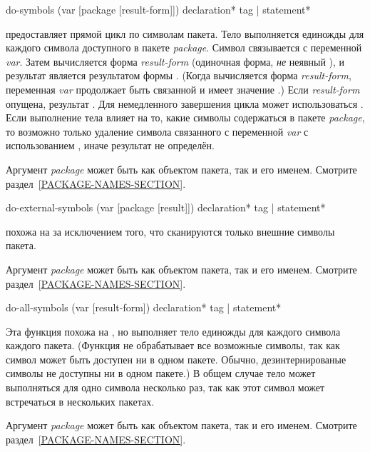 
\begin{defmac}
do-symbols (var [package [result-form]])
           {declaration}* {tag | statement}*

 предоставляет прямой цикл по символам пакета. Тело выполняется
единожды для каждого символа доступного в пакете \emph{package}. Символ
связывается с переменной \emph{var}.
Затем вычисляется форма \emph{result-form} (одиночная форма, \emph{не} неявный
), и результат является результатом формы . (Когда
вычисляется форма \emph{result-form}, переменная \emph{var} продолжает быть
связанной и имеет значение {\false}.) Если \emph{result-form} опущена, результат
{\false}. Для немедленного завершения цикла может использоваться
. Если выполнение тела влияет на то, какие символы содержаться в
пакете \emph{package}, то возможно только удаление символа связанного с
переменной \emph{var} с использованием , иначе результат
не определён.

Аргумент \emph{package} может быть как объектом пакета, так и его
именем. Смотрите раздел~\ref{PACKAGE-NAMES-SECTION}.
\end{defmac}

\begin{defmac}
do-external-symbols (var [package [result]])
                    {declaration}* {tag | statement}*

 похожа на  за исключением того, что
сканируются только внешние символы пакета.

Аргумент \emph{package} может быть как объектом пакета, так и его
именем. Смотрите раздел~\ref{PACKAGE-NAMES-SECTION}.
\end{defmac}

\begin{defmac}
do-all-symbols (var [result-form])
               {declaration}* {tag | statement}*

Эта функция похожа на , но выполняет тело единожды для каждого
символа каждого пакета. (Функция не обрабатывает все возможные символы, так как
символ может быть доступен ни в одном пакете. Обычно, дезинтернированые символы
не доступны ни в одном пакете.)
В общем случае тело может выполняться для одно символа несколько раз, так как
этот символ может встречаться в нескольких пакетах.

Аргумент \emph{package} может быть как объектом пакета, так и его
именем. Смотрите раздел~\ref{PACKAGE-NAMES-SECTION}.
\end{defmac}

\fi